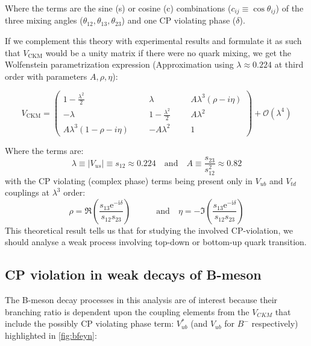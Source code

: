 Where the terms are the sine (s) or cosine (c) combinations ($c_{ij} \equiv \cos\theta_{ij}$) of the three mixing angles ($\theta_{12}, \theta_{13}, \theta_{23}$) and one CP violating phase ($\delta$).

If we complement this theory with experimental results and formulate it as such that $V_{\mathrm{CKM}}$ would be a unity matrix if there were no quark mixing, we get the Wolfenstein parametrization expression (Approximation using $\lambda \approx 0.224$ at third order with parameters $A, \rho, \eta$):

\[
V_{\text{CKM}} = \left( 
\begin{array}{ccccc}
    1 - \frac{\lambda^2}{2} & \phantom{-} & \lambda & \phantom{-} & A\lambda^3(\rho - i\eta) \\
    -\lambda & \phantom{-} & 1 - \frac{\lambda^2}{2} & \phantom{-} & A\lambda^2 \\
    A\lambda^3(1 - \rho - i\eta) & \phantom{-} & -A\lambda^2 & \phantom{-} & 1
\end{array}
\right) + \mathcal{O}(\lambda^4)
\]

Where the terms are:
\[
\lambda \equiv |V_{us}| \equiv s_{12} \approx 0.224 \quad \text{and} \quad A \equiv \frac{s_{23}}{s_{12}^2} \approx 0.82
\]
with the CP violating (complex phase) terms being present only in $V_{ub}$ and $V_{td}$ couplings at $\lambda^3$ order: 
\[
\rho=\Re\left(\frac{s_{13} \mathrm{e}^{-\mathrm{i} \delta}}{s_{12} s_{23}}\right) \quad \quad \quad \text{and} \quad \eta=-\Im\left(\frac{s_{13} \mathrm{e}^{-\mathrm{i} \delta}}{s_{12} s_{23}}\right)
\]
This theoretical result tells us that for studying the involved CP-violation, we should analyse a weak process involving top-down or bottom-up quark transition.

\subsection{CP violation in weak decays of B-meson}

The B-meson decay processes in this analysis are of interest because their branching ratio is dependent upon the coupling elements from the $V_{CKM}$ that include the possibly CP violating phase term: $V^*_{ub}$ (and $V_{ub}$ for $B^{-}$ respectively) highlighted in \autoref{fig:bfeyn}:


